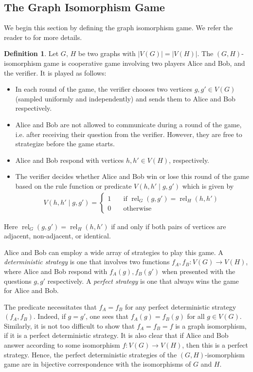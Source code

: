 \documentclass[a4paper,onecolumn,11pt,accepted=2026-01-06]{quantumarticle}
\theoremstyle{plain}
\theoremstyle{remark}
\theoremstyle{definition}
\newtheorem{definition}[thm]{Definition}
\DeclareMathOperator{\rel}{rel}
\newcommand{\card}[1]{\left\lvert #1 \right\rvert}
\begin{document}
\subsection{The Graph Isomorphism Game}\label{sec:quant-iso-npa}

We begin this section by defining the graph isomorphism game. We refer the reader to \cite{ATSERIAS2019289} for more details. 

\begin{definition}
    Let $G$, $H$ be two graphs with $\card{V(G)} = \card{V(H)}$. The $(G,H)$-isomorphism game is cooperative game involving two players Alice and Bob, and the verifier. It is played as follows: 
\begin{itemize}
    \item In each round of the game, the verifier chooses two vertices $g, g' \in V(G)$ (sampled uniformly and independently) and sends them to Alice and Bob respectively. 
    \item Alice and Bob are not allowed to communicate during a round of the game, i.e. after receiving their question from the verifier. However, they are free to strategize before the game starts. 
    \item Alice and Bob respond with vertices $h, h' \in V(H)$, respectively. 
    \item The verifier decides whether Alice and Bob win or lose this round of the game based on the rule function or predicate $V(h,h'\mid g,g')$ which is given by
    \begin{align*}
        V(h,h'\mid g,g') = \begin{cases}
            1 &\quad \text{if } \rel_G(g,g') = \rel_H(h,h') \\
            0 &\quad \text{otherwise}
        \end{cases}
    \end{align*}
\end{itemize}
  Here $\rel_G(g,g') = \rel_H(h, h')$ if and only if both pairs of vertices are adjacent, non-adjacent, or identical.
\end{definition}

Alice and Bob can employ a wide array of strategies to play this game. A \emph{deterministic strategy} is one that involves two functions $f_A, f_B\colon  V(G) \to V(H)$, where Alice and Bob respond with $f_A(g), f_B(g')$ when presented with the questions $g,g'$ respectively. A \emph{perfect strategy} is one that always wins the game for Alice and Bob. 

The predicate necessitates that $f_A = f_B$ for any perfect deterministic strategy $(f_A, f_B)$. Indeed, if $g = g'$, one sees that $f_A(g) = f_B(g)$ for all $g \in V(G)$. Similarly, it is not too difficult to show that $f_A = f_B = f$ is a graph isomorphism, if it is a perfect deterministic strategy. It is also clear that if Alice and Bob answer according to some isomorphism $f\colon V(G) \to V(H)$, then this is a perfect strategy. Hence, the perfect deterministic strategies of the $(G,H)$-isomorphism game are in bijective correspondence with the isomorphisms of $G$ and $H$.
\end{document}
